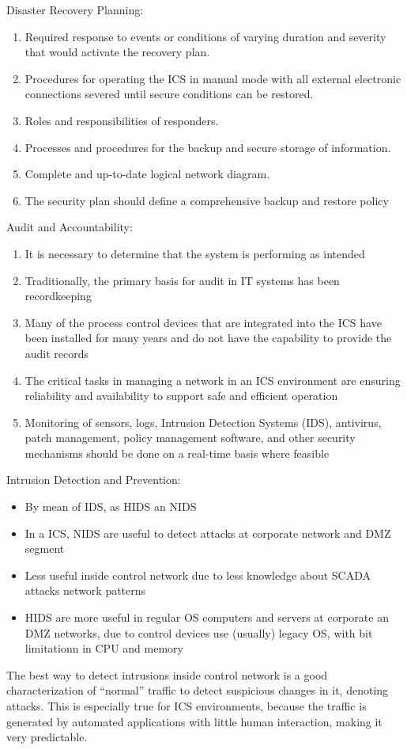 Disaster Recovery Planning:
\begin{enumerate}
	\item Required response to events or conditions of varying duration
and severity that would activate the recovery plan.
	\item Procedures for operating the ICS in manual mode with all
external electronic connections severed until secure conditions
can be restored.
	\item Roles and responsibilities of responders.
	\item Processes and procedures for the backup and secure storage of
information.
	\item Complete and up-to-date logical network diagram.
	\item The security plan should define a comprehensive backup and
restore policy
\end{enumerate}

Audit and Accountability:
\begin{enumerate}
	\item It is necessary to determine that the system is performing as intended
	\item Traditionally, the primary basis for audit in IT systems has been
recordkeeping
	\item Many of the process control devices that are integrated into the ICS have
been installed for many years and do not have the capability to provide
the audit records
	\item The critical tasks in managing a network in an ICS environment are
ensuring reliability and availability to support safe and efficient operation
	\item Monitoring of sensors, logs, Intrusion Detection Systems (IDS), antivirus,
patch management, policy management software, and other security
mechanisms should be done on a real-time basis where feasible
\end{enumerate}

Intrusion Detection and Prevention:
\begin{itemize}
	\item By mean of IDS, as HIDS an NIDS
	\item In a ICS, NIDS are useful to detect attacks at corporate network and
DMZ segment
	\item Less useful inside control network due to less knowledge about SCADA
attacks network patterns
	\item HIDS are more useful in regular OS computers and servers at corporate
an DMZ networks, due to control devices use (usually) legacy OS, with
bit limitationn in CPU and memory
\end{itemize}
The best way to detect intrusions inside control network is a good
characterization of ``normal'' traffic to detect suspicious changes in it,
denoting attacks. This is especially true for ICS environments, because the traffic is generated by automated applications with little human interaction, making it very predictable.

